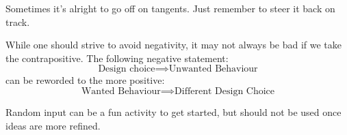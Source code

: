 \documentclass{beamer}
\begin{document}
{\begin{takeaway}
        Sometimes it's alright to go off on tangents. Just remember to steer it back on track.
    \end{takeaway}
    \begin{takeaway}
        While one should strive to avoid negativity, it may not always be bad if we take the contrapositive. The following negative statement:
        \begin{equation}
            \text{Design choice} \implies \text{Unwanted Behaviour}
        \end{equation}
        can be reworded to the more positive:
        \begin{equation}
            \text{Wanted Behaviour} \implies \text{Different Design Choice}
        \end{equation}
    \end{takeaway}
    \begin{takeaway}
        Random input can be a fun activity to get started, but should not be used once ideas are more refined.
    \end{takeaway}
}
\end{document}
